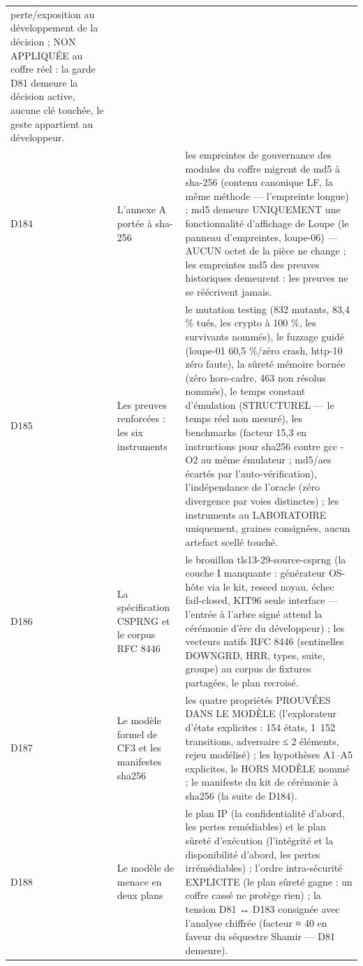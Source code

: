 \begin{longtable}{@{}p{1.6cm} p{4.6cm} >{\raggedright\arraybackslash}p{9.5cm}@{}}
perte/exposition au développement de la décision ; NON APPLIQUÉE au coffre
réel : la garde D81 demeure la décision active, aucune clé touchée, le
geste appartient au développeur. \\
D184 & L'annexe A portée à sha-256 & les empreintes de gouvernance des
modules du coffre migrent de md5 à sha-256 (contenu canonique LF, la même
méthode — l'empreinte longue) ; md5 demeure UNIQUEMENT une fonctionnalité
d'affichage de Loupe (le panneau d'empreintes, loupe-06) — AUCUN octet de
la pièce ne change ; les empreintes md5 des preuves historiques demeurent
: les preuves ne se réécrivent jamais. \\
D185 & Les preuves renforcées : les six instruments & le mutation
testing (832 mutants, 83,4 \% tués, les crypto à 100 \%, les survivants
nommés), le fuzzage guidé (loupe-01 60,5 \%/zéro crash, http-10 zéro
faute), la sûreté mémoire bornée (zéro hors-cadre, 463 non résolus
nommés), le temps constant d'émulation (STRUCTUREL — le temps réel non
mesuré), les benchmarks (facteur 15,3 en instructions pour sha256 contre
gcc -O2 au même émulateur ; md5/aes écartés par l'auto-vérification),
l'indépendance de l'oracle (zéro divergence par voies distinctes) ; les
instruments au LABORATOIRE uniquement, graines consignées, aucun
artefact scellé touché. \\
D186 & La spécification CSPRNG et le corpus RFC 8446 & le brouillon
tls13-29-source-csprng (la couche I manquante : générateur OS-hôte via
le kit, reseed noyau, échec fail-closed, KIT96 seule interface —
l'entrée à l'arbre signé attend la cérémonie d'ère du développeur) ; les
vecteurs natifs RFC 8446 (sentinelles DOWNGRD, HRR, types, suite,
groupe) au corpus de fixtures partagées, le plan recroisé. \\
D187 & Le modèle formel de CF3 et les manifestes sha256 & les quatre
propriétés PROUVÉES DANS LE MODÈLE (l'explorateur d'états explicites :
154 états, 1~152 transitions, adversaire ≤ 2 éléments, rejeu modélisé) ;
les hypothèses A1--A5 explicites, le HORS MODÈLE nommé ; le manifeste
du kit de cérémonie à sha256 (la suite de D184). \\
D188 & Le modèle de menace en deux plans & le plan IP (la confidentialité
d'abord, les pertes remédiables) et le plan sûreté d'exécution
(l'intégrité et la disponibilité d'abord, les pertes irrémédiables) ;
l'ordre intra-sécurité EXPLICITE (le plan sûreté gagne : un coffre cassé
ne protège rien) ; la tension D81 ↔ D183 consignée avec l'analyse
chiffrée (facteur ≈ 40 en faveur du séquestre Shamir — D81 demeure). \\

\end{longtable}
